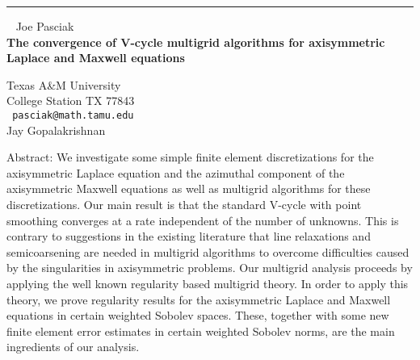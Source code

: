 \documentclass{report}
\begin{document}
\begin{center}

\rule{6in}{1pt} \
{\large
Joe Pasciak
\\ {\bf
The convergence of V-cycle multigrid algorithms for axisymmetric
Laplace and Maxwell equations
}}

Texas A\&M University \\ College Station TX 77843
\\ {\tt
pasciak@math.tamu.edu
}
\\
Jay Gopalakrishnan
\end{center}


Abstract: We investigate some simple finite element discretizations for
the axisymmetric Laplace equation and the azimuthal component of the
axisymmetric Maxwell equations as well as multigrid algorithms for
these discretizations. Our main result is that the standard V-cycle
with point smoothing converges at a rate independent of the number of
unknowns. This is contrary to suggestions in the existing literature
that line relaxations and semicoarsening are needed in multigrid
algorithms to overcome difficulties caused by the singularities in
axisymmetric problems. Our multigrid analysis proceeds by applying the
well known regularity based multigrid theory. In order to apply this
theory, we prove regularity results for the axisymmetric Laplace and
Maxwell equations in certain weighted Sobolev spaces. These, together
with some new finite element error estimates in certain weighted
Sobolev norms, are the main ingredients of our analysis.
\end{document}
